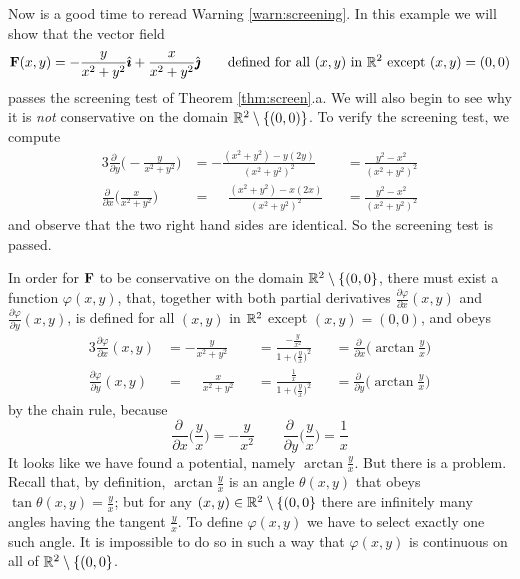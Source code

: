 \begin{eg}\label{eg:screeningCounterexample}
Now is a good time to reread Warning \ref{warn:screening}.
In this example we will show that the vector field
\begin{equation*}
\mathbf{F}(x,y) = -\frac{y}{x^2+y^2}\hat{\pmb{\imath}} + \frac{x}{x^2+y^2}\hat{\pmb{\jmath}}
\qquad \text{defined for all $(x,y)$ in $\mathbb{R}^2$ except $(x,y)=(0,0)$}
\end{equation*}
passes the screening test of Theorem \ref{thm:screen}.a. We will also
begin to see why it is \emph{not} conservative on the domain
$\mathbb{R}^2\setminus\{(0,0)\}$. To verify the screening test, we compute
\begin{alignat*}{3}
\frac{\partial\ }{\partial y}\Big(-\frac{y}{x^2+y^2}\Big)
  &= -\frac{(x^2+y^2) - y(2y)}{{(x^2+y^2)}^2} 
  &&= \frac{y^2-x^2}{{(x^2+y^2)}^2} \\
\frac{\partial\ }{\partial x}\Big(\frac{x}{x^2+y^2}\Big)
  &=\phantom{-} \frac{(x^2+y^2) - x(2x)}{{(x^2+y^2)}^2} 
  &&= \frac{y^2-x^2}{{(x^2+y^2)}^2}
\end{alignat*}
and observe that the two right hand sides are identical. So the
screening test is passed.

In order for $\mathbf{F}$ to be conservative on the domain
$\mathbb{R}^2\setminus\{(0,0\}$, there must exist a function
$\varphi(x,y)$, that, together with both partial derivatives 
$\frac{\partial \varphi}{\partial x}(x,y)$ and 
$\frac{\partial \varphi}{\partial y}(x,y)$, is defined for all $(x,y)$ 
in $\mathbb{R}^2$ except $(x,y)=(0,0)$, and obeys
\begin{alignat*}{3}
\frac{\partial \varphi}{\partial x}(x,y) &= -\frac{y}{x^2+y^2}
&&= \frac{-\frac{y}{x^2}}{1+\big(\frac{y}{x}\big)^2}
&&=\frac{\partial\ }{\partial x}\Big(\arctan\frac{y}{x}\Big) \\
\frac{\partial \varphi}{\partial y}(x,y) &= \phantom{-} \frac{x}{x^2+y^2} 
&&= \frac{\frac{1}{x}}{1+\big(\frac{y}{x}\big)^2}
&&=\frac{\partial\ }{\partial y}\Big(\arctan\frac{y}{x}\Big)
\end{alignat*}
by the chain rule, because
\begin{equation*}
\frac{\partial\ }{\partial x}\Big(\frac{y}{x}\Big) =-\frac{y}{x^2}
\qquad
\frac{\partial\ }{\partial y}\Big(\frac{y}{x}\Big)=\frac{1}{x}
\end{equation*}
It looks like we have found a potential, namely $\arctan\frac{y}{x}$.
But there is a problem. Recall that, by definition, $\arctan\frac{y}{x}$ is 
an angle $\theta(x,y)$ that obeys
$\tan\theta(x,y)= \frac{y}{x}$; but for any 
$(x,y)\in\mathbb{R}^2\setminus\{(0,0\}$ there are infinitely many angles 
having the tangent $\frac{y}{x}$. To define $\varphi(x,y)$ we have to 
select exactly one such angle. It is impossible to do so in such a way 
that $\varphi(x,y)$ is continuous on all of $\mathbb{R}^2\setminus\{(0,0\}$.


\end{eg}
